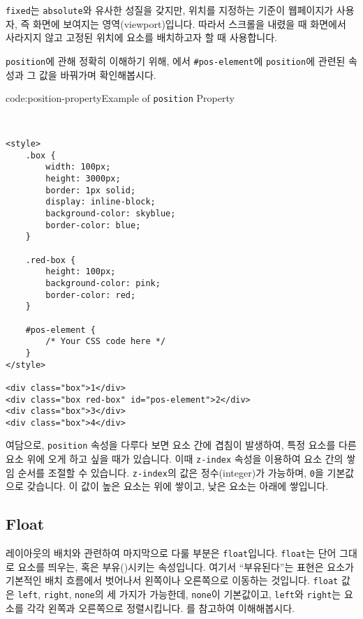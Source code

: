 \verb|fixed|는 \verb|absolute|와 유사한 성질을 갖지만, 위치를 지정하는 기준이 웹페이지가 사용자, 즉 화면에 보여지는 영역(viewport)입니다. 따라서 스크롤을 내렸을 때 화면에서 사라지지 않고 고정된 위치에 요소를 배치하고자 할 때 사용합니다. 

\verb|position|에 관해 정확히 이해하기 위해, 에서 \verb|#pos-element|에 \verb|position|에 관련된 속성과 그 값을 바꿔가며 확인해봅시다. 

\begin{codeenv}{code:position-property}{Example of \texttt{position} Property}\begin{verbatim}


<style>
    .box {
        width: 100px;
        height: 3000px;
        border: 1px solid;
        display: inline-block;
        background-color: skyblue;
        border-color: blue;
    }

    .red-box {
        height: 100px;
        background-color: pink;
        border-color: red;
    }

    #pos-element {
        /* Your CSS code here */
    }
</style>

<div class="box">1</div>
<div class="box red-box" id="pos-element">2</div>
<div class="box">3</div>
<div class="box">4</div>
\end{verbatim}
\end{codeenv}

여담으로, \verb|position| 속성을 다루다 보면 요소 간에 겹침이 발생하여, 특정 요소를 다른 요소 위에 오게 하고 싶을 때가 있습니다. 이때 \verb|z-index| 속성을 이용하여 요소 간의 쌓임 순서를 조절할 수 있습니다. \verb|z-index|의 값은 정수(integer)가 가능하며, \verb|0|을 기본값으로 갖습니다. 이 값이 높은 요소는 위에 쌓이고, 낮은 요소는 아래에 쌓입니다. 

\subsection*{Float}
레이아웃의 배치와 관련하여 마지막으로 다룰 부분은 \verb|float|입니다. \verb|float|는 단어 그대로 요소를 띄우는, 혹은 부유()시키는 속성입니다. 여기서 ``부유된다''는 표현은 요소가 기본적인 배치 흐름에서 벗어나서 왼쪽이나 오른쪽으로 이동하는 것입니다. \verb|float| 값은 \verb|left|, \verb|right|, \verb|none|의 세 가지가 가능한데, \verb|none|이 기본값이고, \verb|left|와 \verb|right|는 요소를 각각 왼쪽과 오른쪽으로 정렬시킵니다. 를 참고하여 이해해봅시다. 

